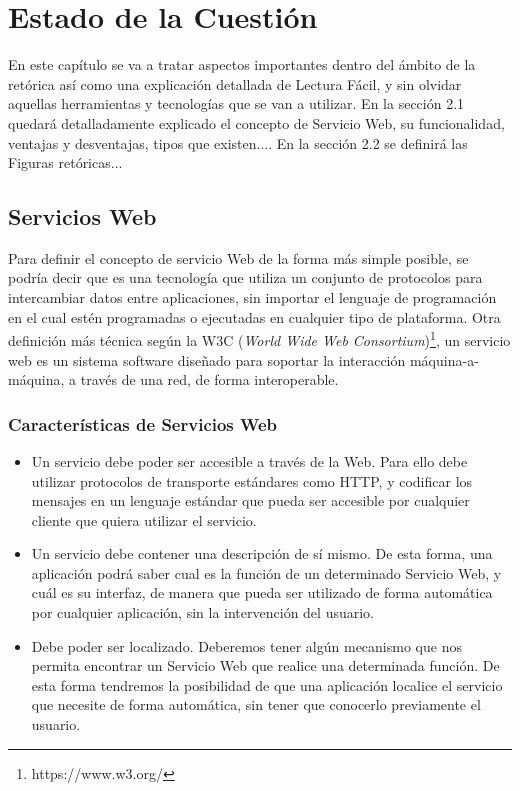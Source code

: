 \chapter{Estado de la Cuestión}
\label{cap:estadoDeLaCuestion}
En este capítulo se va a tratar aspectos importantes dentro del ámbito de la retórica así como una explicación detallada de Lectura Fácil, y sin olvidar aquellas herramientas y tecnologías que se van a utilizar.
En la sección 2.1 quedará detalladamente explicado el concepto de Servicio Web, su funcionalidad, ventajas y desventajas, tipos que existen....
En la sección 2.2 se definirá las Figuras retóricas...



\section{Servicios Web}
\label{cap:sec:servicios_web}

Para definir el concepto de servicio Web de la forma más simple posible, se podría decir que es una tecnología que utiliza un conjunto de protocolos para intercambiar datos entre aplicaciones, sin importar el lenguaje de programación en el cual estén programadas o ejecutadas en cualquier tipo de plataforma. Otra definición más técnica según la W3C (\textit{World Wide Web Consortium})\footnote{https://www.w3.org/},  un servicio web es un sistema software diseñado para soportar la interacción máquina-a-máquina, a través de una red, de forma interoperable. 

\subsection{Características de  Servicios Web}
\label{cap:subsec:serviciosweb}

\begin{itemize}
\item Un servicio debe poder ser accesible a través de la Web. Para ello debe utilizar protocolos de transporte estándares como HTTP, y codificar los mensajes en un lenguaje estándar que pueda ser accesible por cualquier cliente que quiera utilizar el servicio. 

\item Un servicio debe contener una descripción de sí mismo. De esta forma, una aplicación podrá saber cual es la función de un determinado Servicio Web, y cuál es su interfaz, de manera que pueda ser utilizado de forma automática por cualquier aplicación, sin la intervención del usuario.
\item Debe poder ser localizado. Deberemos tener algún mecanismo que nos permita encontrar un Servicio Web que realice una determinada función. De esta forma tendremos la posibilidad de que una aplicación localice el servicio que necesite de forma automática, sin tener que conocerlo previamente el usuario.
\end{itemize}


